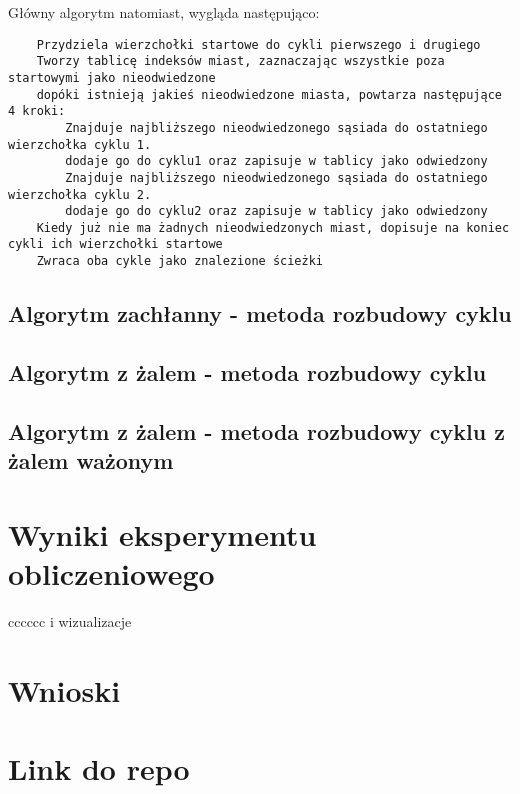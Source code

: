 \documentclass[11pt]{article}
\begin{document}
Główny algorytm natomiast, wygląda następująco: \\

\begin{verbatim}
    Przydziela wierzchołki startowe do cykli pierwszego i drugiego
    Tworzy tablicę indeksów miast, zaznaczając wszystkie poza startowymi jako nieodwiedzone
    dopóki istnieją jakieś nieodwiedzone miasta, powtarza następujące 4 kroki:
        Znajduje najbliższego nieodwiedzonego sąsiada do ostatniego wierzchołka cyklu 1.
        dodaje go do cyklu1 oraz zapisuje w tablicy jako odwiedzony
        Znajduje najbliższego nieodwiedzonego sąsiada do ostatniego wierzchołka cyklu 2.
        dodaje go do cyklu2 oraz zapisuje w tablicy jako odwiedzony
    Kiedy już nie ma żadnych nieodwiedzonych miast, dopisuje na koniec cykli ich wierzchołki startowe
    Zwraca oba cykle jako znalezione ścieżki

\end{verbatim}

\subsection{Algorytm zachłanny - metoda rozbudowy cyklu}\label{subsec:algorytm-zachanny---metoda-rozbudowy-cyklu}

\subsection{Algorytm z żalem - metoda rozbudowy cyklu}\label{subsec:algorytm-z-zalem---metoda-rozbudowy-cyklu}

\subsection{Algorytm z żalem - metoda rozbudowy cyklu z żalem ważonym}\label{subsec:algorytm-z-zalem---metoda-rozbudowy-cyklu-z-zalem-wazonym}


\section{Wyniki eksperymentu obliczeniowego}\label{sec:wyniki-eksperymenty-obliczeniowego}

cccccc i wizualizacje

\section{Wnioski}\label{sec:wnioski}

\section{Link do repo}\label{sec:link-do-repo}
\end{document}
